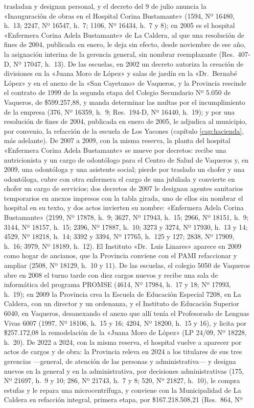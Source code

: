 trasladan y designan personal, y el decreto del 9 de julio anuncia la «Inauguración de obras en el Hospital Corina Bustamante» (1594, Nº 16480, h.\ 13; 2247, Nº 16547, h.\ 7; 1106, Nº 16434, h.\ 7 y 8); en 2005 es el hospital «Enfermera Corina Adela Bustamante» de La Caldera, al que una resolución de fines de 2004, publicada en enero, le deja sin efecto, desde noviembre de ese año, la asignación interina de la gerencia general, sin nombrar reemplazante (Res.\ 407-D, Nº 17047, h.\ 13). De las escuelas, en 2002 un decreto autoriza la creación de divisiones en la «Juana Moro de López» y salas de jardín en la «Dr.\ Bernabé López» y en el anexo de la «San Cayetano» de Vaqueros, y la Provincia rescinde el contrato de 1999 de la segunda etapa del Colegio Secundario Nº 5.050 de Vaqueros, de \$599.257,88, y manda determinar las multas por el incumplimiento de la empresa (376, Nº 16359, h.\ 9; Res.\ 194-D, Nº 16440, h.\ 19); y por una resolución de fines de 2004, publicada en enero de 2005, le adjudica al municipio, por convenio, la refacción de la escuela de Los Yacones (capítulo \ref{cap:hacienda}, más adelante). De 2007 a 2009, con la misma reserva, la planta del hospital «Enfermera Corina Adela Bustamante» se mueve por decretos: recibe una nutricionista y un cargo de odontólogo para el Centro de Salud de Vaqueros y, en 2009, una odontóloga y una asistente social; pierde por traslado un chofer y una odontóloga, cubre con otra enfermera el cargo de una jubilada y convierte en chofer un cargo de servicios; dos decretos de 2007 le designan agentes sanitarios temporarios en anexos impresos con la tabla girada, uno de ellos sin nombrar el hospital en su texto, y dos actos invierten su nombre: «Enfermera Adela Corina Bustamante» (2199, Nº 17878, h.\ 9; 3627, Nº 17943, h.\ 15; 2966, Nº 18151, h.\ 9; 3144, Nº 18157, h.\ 15; 2396, Nº 17887, h.\ 10; 3273 y 3274, Nº 17930, h.\ 13 y 14; 4529, Nº 18218, h.\ 14; 3392 y 3394, Nº 17765, h.\ 125 y 127; 2838, Nº 17909, h.\ 16; 3979, Nº 18189, h.\ 12). El Instituto «Dr.\ Luis Linares» aparece en 2009 como hogar de ancianos, que la Provincia conviene con el PAMI refaccionar y ampliar (2508, Nº 18129, h.\ 10 y 11). De las escuelas, el colegio 5050 de Vaqueros abre en 2008 el turno tarde con diez cargos nuevos y recibe una sala de informática del programa PROMSE (4614, Nº 17984, h.\ 17 y 18; Nº 17993, h.\ 19); en 2009 la Provincia crea la Escuela de Educación Especial 7208, en La Caldera, con un director y un ordenanza, y el Instituto de Educación Superior 6040, en Vaqueros, desanexando el anexo que allí tenía el Profesorado de Lenguas Vivas 6007 (1997, Nº 18106, h.\ 15 y 16; 4204, Nº 18200, h.\ 15 y 16), y licita por \$257.172,08 la remodelación de la «Juana Moro de López» (LP 24/09, Nº 18228, h.\ 20). De 2022 a 2024, con la misma reserva, el hospital vuelve a aparecer por actos de cargos y de obra: la Provincia releva en 2024 a los titulares de sus tres gerencias ---general, de atención de las personas y administrativa--- y designa nuevos en la general y en la administrativa, por decisiones administrativas (175, Nº 21697, h.\ 9 y 10; 286, Nº 21743, h.\ 7 y 8; 520, Nº 21827, h.\ 10), le compra estufas y le repara una microcentrífuga, y conviene con la Municipalidad de La Caldera su refacción integral, primera etapa, por \$167.218.508,21 (Res.\ 864, Nº 